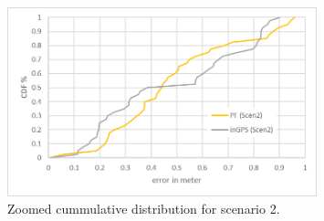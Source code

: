 \begin{figure}[th]
\centering
\includegraphics[width=0.8\textwidth]{Figures/cdf_scenario2}
\decoRule
\caption[CDF Scenario 2]{Zoomed cummulative distribution for scenario 2.}
\label{fig:cdf_scenario2}
\end{figure}

